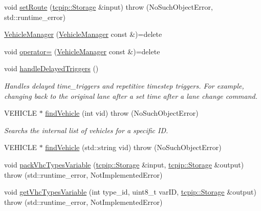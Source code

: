 \begin{DoxyCompactItemize}
\item 
void \hyperlink{classtraci__api_1_1_vehicle_manager_a30063f71f02a6272244d7d1e1e9ec99d}{set\+Route} (\hyperlink{classtcpip_1_1_storage}{tcpip\+::\+Storage} \&input)  throw (\+No\+Such\+Object\+Error, std\+::runtime\+\_\+error)
\item 
\hyperlink{classtraci__api_1_1_vehicle_manager_a7e9e05b65776f0709f0b84a51c44377f}{Vehicle\+Manager} (\hyperlink{classtraci__api_1_1_vehicle_manager}{Vehicle\+Manager} const \&)=delete
\item 
void \hyperlink{classtraci__api_1_1_vehicle_manager_a3e5ca16c51d63faee6a3a9eb3a4ffafa}{operator=} (\hyperlink{classtraci__api_1_1_vehicle_manager}{Vehicle\+Manager} const \&)=delete
\item 
void \hyperlink{classtraci__api_1_1_vehicle_manager_a4e656c9c9b434113e01331cf0b84babc}{handle\+Delayed\+Triggers} ()
\begin{DoxyCompactList}\small\item\em Handles delayed time\+\_\+triggers and repetitive timestep triggers. For example, changing back to the original lane after a set time after a lane change command. \end{DoxyCompactList}\item 
V\+E\+H\+I\+C\+LE $\ast$ \hyperlink{classtraci__api_1_1_vehicle_manager_a46fe50f2be4e9eb6df8f62b9a6e7aa53}{find\+Vehicle} (int vid)  throw (\+No\+Such\+Object\+Error)
\begin{DoxyCompactList}\small\item\em Searchs the internal list of vehicles for a specific ID. \end{DoxyCompactList}\item 
V\+E\+H\+I\+C\+LE $\ast$ \hyperlink{classtraci__api_1_1_vehicle_manager_a4fc72da33abd7a0323fd27c7721ba3ef}{find\+Vehicle} (std\+::string vid)  throw (\+No\+Such\+Object\+Error)
\item 
void \hyperlink{classtraci__api_1_1_vehicle_manager_abf96c7635d046d03bc02aa0cbc384d17}{pack\+Vhc\+Types\+Variable} (\hyperlink{classtcpip_1_1_storage}{tcpip\+::\+Storage} \&input, \hyperlink{classtcpip_1_1_storage}{tcpip\+::\+Storage} \&output)  throw (std\+::runtime\+\_\+error, Not\+Implemented\+Error)
\item 
void \hyperlink{classtraci__api_1_1_vehicle_manager_af404c1fa8e1459cbf415d1f4931c3ad6}{get\+Vhc\+Types\+Variable} (int type\+\_\+id, uint8\+\_\+t var\+ID, \hyperlink{classtcpip_1_1_storage}{tcpip\+::\+Storage} \&output)  throw (std\+::runtime\+\_\+error, Not\+Implemented\+Error)
\item 

\end{DoxyCompactItemize}
